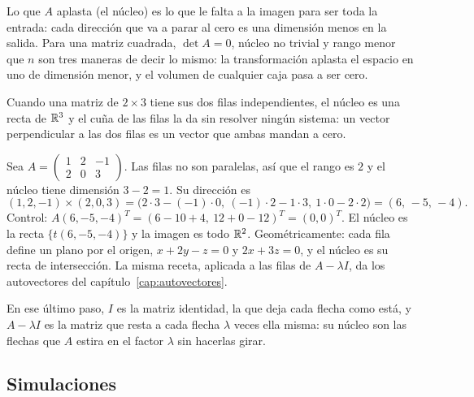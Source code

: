 Lo que \(A\) aplasta (el núcleo) es lo que le falta a la imagen para ser toda la
entrada: cada dirección que va a parar al cero es una dimensión menos en la salida. Para una
matriz cuadrada, \(\det A=0\), núcleo no trivial y rango menor que \(n\) son tres maneras de
decir lo mismo: la transformación aplasta el espacio en uno de dimensión menor, y el volumen
de cualquier caja pasa a ser cero.

Cuando una matriz de \(2\times3\) tiene sus dos filas independientes, el núcleo es una recta
de \(\mathbb{R}^3\) y el cuña de las filas la da sin resolver ningún sistema: un vector perpendicular
a las dos filas es un vector que ambas mandan a cero.

\begin{ejemplo}\label{ej:nucleo-cuna}
Sea \(A=\begin{pmatrix}1&2&-1\\2&0&3\end{pmatrix}\). Las filas no son paralelas, así que el
rango es \(2\) y el núcleo tiene dimensión \(3-2=1\). Su dirección es
\[
  (1,2,-1)\times(2,0,3)=\bigl(2\cdot3-(-1)\cdot0,\ (-1)\cdot2-1\cdot3,\ 1\cdot0-2\cdot2\bigr)
  =(6,\,-5,\,-4).
\]
Control: \(A(6,-5,-4)^T=(6-10+4,\ 12+0-12)^T=(0,0)^T\). El núcleo es la recta
\(\{t(6,-5,-4)\}\) y la imagen es todo \(\mathbb{R}^2\). Geométricamente: cada fila define un plano
por el origen, \(x+2y-z=0\) y \(2x+3z=0\), y el núcleo es su recta de intersección. La misma
receta, aplicada a las filas de \(A-\lambda I\), da los autovectores del
capítulo~\ref{cap:autovectores}.
\end{ejemplo}

En ese último paso, \(I\) es la matriz identidad, la que deja cada flecha como está, y
\(A-\lambda I\) es la matriz que resta a cada flecha \(\lambda\) veces ella misma: su núcleo son
las flechas que \(A\) estira en el factor \(\lambda\) sin hacerlas girar.

\subsection{Simulaciones}


